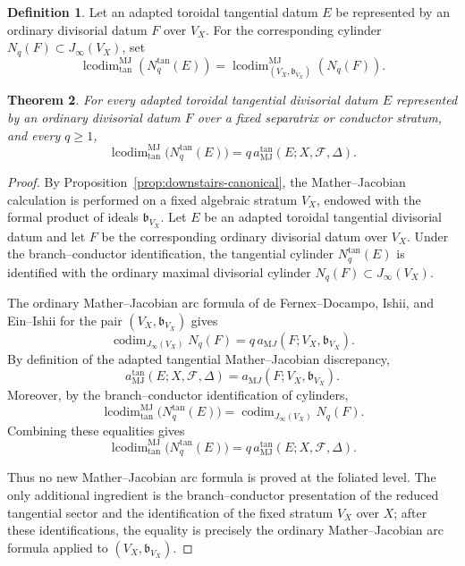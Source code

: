 \documentclass[11pt]{amsart}
\numberwithin{equation}{section}
\theoremstyle{plain}
\newtheorem{Theorem}{Theorem}[section]
\theoremstyle{definition}
\newtheorem{Definition}[Theorem]{Definition}
\newcommand{\codim}{\operatorname{codim}}
\newcommand{\lcodim}{\operatorname{lcodim}}
\newcommand{\MJ}{\mathrm{MJ}}
\newcommand{\bbound}{\mathfrak b}
\newcommand{\cF}{\mathcal F}
\begin{document}
\begin{Definition}
Let an adapted toroidal tangential datum $E$ be represented by an ordinary divisorial datum $F$ over $V_X$. For the corresponding cylinder $N_q(F)\subset J_\infty(V_X)$, set
\[
\lcodim^{\MJ}_{\tan}(N_q^{\tan}(E))=
\lcodim^{\MJ}_{(V_X,\bbound_{V_X})}(N_q(F)).
\]
\end{Definition}

\begin{Theorem}
\label{thm:mj-cylinder}
For every adapted toroidal tangential divisorial datum $E$ represented by an ordinary divisorial datum $F$ over a fixed separatrix or conductor stratum, and every $q\ge1$,
\[
\lcodim^{\MJ}_{\tan}\bigl(N_q^{\tan}(E)\bigr)
=q\,a^{\tan}_{\MJ}(E;X,\cF,\Delta).
\]
\end{Theorem}

\begin{proof}
By Proposition~\ref{prop:downstairs-canonical}, the Mather--Jacobian calculation is performed on a fixed algebraic stratum \(V_X\), endowed with the formal product of ideals \(\bbound_{V_X}\). Let \(E\) be an adapted toroidal tangential divisorial datum and let \(F\) be the corresponding ordinary divisorial datum over \(V_X\). Under the branch--conductor identification, the tangential cylinder \(N_q^{\tan}(E)\) is identified with the ordinary maximal divisorial cylinder \(N_q(F)\subset J_\infty(V_X)\).

The ordinary Mather--Jacobian arc formula of de Fernex--Docampo, Ishii, and Ein--Ishii \cite{dFD,IshiiMather,EI} for the pair \((V_X,\bbound_{V_X})\) gives
\[
\codim_{J_\infty(V_X)}
N_q(F)
=
q\,a_{\mathrm MJ}(F;V_X,\bbound_{V_X}).
\]
By definition of the adapted tangential Mather--Jacobian discrepancy,
\[
a^{\tan}_{\MJ}(E;X,\cF,\Delta)
=
a_{\mathrm MJ}(F;V_X,\bbound_{V_X}).
\]
Moreover, by the branch--conductor identification of cylinders,
\[
\lcodim^{\MJ}_{\tan}\bigl(N_q^{\tan}(E)\bigr)
=
\codim_{J_\infty(V_X)}N_q(F).
\]
Combining these equalities gives
\[
\lcodim^{\MJ}_{\tan}\bigl(N_q^{\tan}(E)\bigr)
=
q\,a^{\tan}_{\MJ}(E;X,\cF,\Delta).
\]

Thus no new Mather--Jacobian arc formula is proved at the foliated level. The only additional ingredient is the branch--conductor presentation of the reduced tangential sector and the identification of the fixed stratum \(V_X\) over \(X\); after these identifications, the equality is precisely the ordinary Mather--Jacobian arc formula \cite{dFD,IshiiMather,EI} applied to \((V_X,\bbound_{V_X})\).
\end{proof}
\end{document}
